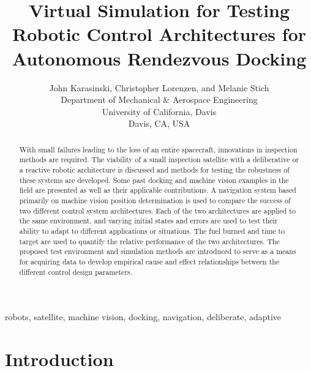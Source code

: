 \documentclass[journal, 10pt]{IEEEtran}
\begin{document}
\title{Virtual Simulation for Testing Robotic Control Architectures for Autonomous Rendezvous Docking }

\author{John Karasinski, Christopher Lorenzen, and Melanie Stich\\Department of Mechanical \& Aerospace Engineering\\University of California, Davis\\Davis, CA, USA }

\maketitle

\begin{abstract}
With small failures leading to the loss of an entire spacecraft, innovations in inspection methods are required.  The viability of a small inspection satellite with a deliberative or a reactive robotic architecture is discussed and methods for testing the robustness of these systems are developed.  Some past docking and machine vision examples in the field are presented as well as their applicable contributions.  A navigation system based primarily on machine vision position determination is used to compare the success of two different control system architectures.  Each of the two architectures are applied to the same environment, and varying initial states and errors are used to test their ability to adapt to different applications or situations.  The fuel burned and time to target are used to quantify the relative performance of the two architectures.  The proposed test environment and simulation methods are introduced to serve as a means for acquiring data to develop empirical cause and effect relationships between the different control design parameters.
\end{abstract}

\begin{IEEEkeywords}
robots, satellite, machine vision, docking, navigation, deliberate, adaptive
\end{IEEEkeywords}


\section{Introduction}
\end{document}
